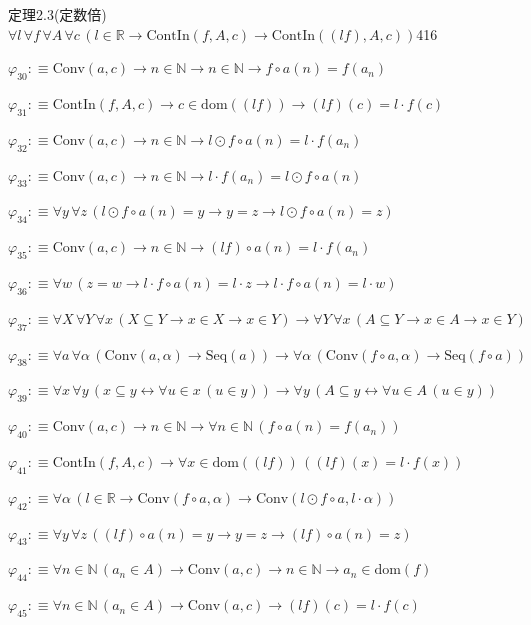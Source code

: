 \begin{fullproof}{定理2.3(定数倍)}{$\forall l\,\forall f\,\forall A\,\forall c\,(l \in \mathbb{R} \to \mathrm{ContIn}(f,A,c) \to \mathrm{ContIn}((l f),A,c))$}{416}
\begin{abbrevlist}
\item $\varphi_{30} :\equiv \mathrm{Conv}(a,c) \to n \in \mathbb{N} \to n \in \mathbb{N} \to f \circ a(n) = f(a_{n})$
\item $\varphi_{31} :\equiv \mathrm{ContIn}(f,A,c) \to c \in \mathrm{dom}((l f)) \to (l f)(c) = l \cdot f(c)$
\item $\varphi_{32} :\equiv \mathrm{Conv}(a,c) \to n \in \mathbb{N} \to l \odot f \circ a(n) = l \cdot f(a_{n})$
\item $\varphi_{33} :\equiv \mathrm{Conv}(a,c) \to n \in \mathbb{N} \to l \cdot f(a_{n}) = l \odot f \circ a(n)$
\item $\varphi_{34} :\equiv \forall y\,\forall z\,(l \odot f \circ a(n) = y \to y = z \to l \odot f \circ a(n) = z)$
\item $\varphi_{35} :\equiv \mathrm{Conv}(a,c) \to n \in \mathbb{N} \to (l f) \circ a(n) = l \cdot f(a_{n})$
\item $\varphi_{36} :\equiv \forall w\,(z = w \to l \cdot f \circ a(n) = l \cdot z \to l \cdot f \circ a(n) = l \cdot w)$
\item $\varphi_{37} :\equiv \forall X\,\forall Y\,\forall x\,(X \subseteq Y \to x \in X \to x \in Y) \to \forall Y\,\forall x\,(A \subseteq Y \to x \in A \to x \in Y)$
\item $\varphi_{38} :\equiv \forall a\,\forall \alpha\,(\mathrm{Conv}(a,\alpha) \to \mathrm{Seq}(a)) \to \forall \alpha\,(\mathrm{Conv}(f \circ a,\alpha) \to \mathrm{Seq}(f \circ a))$
\item $\varphi_{39} :\equiv \forall x\,\forall y\,(x \subseteq y \leftrightarrow \forall u \in x\,(u \in y)) \to \forall y\,(A \subseteq y \leftrightarrow \forall u \in A\,(u \in y))$
\item $\varphi_{40} :\equiv \mathrm{Conv}(a,c) \to n \in \mathbb{N} \to \forall n \in \mathbb{N}\,(f \circ a(n) = f(a_{n}))$
\item $\varphi_{41} :\equiv \mathrm{ContIn}(f,A,c) \to \forall x \in \mathrm{dom}((l f))\,((l f)(x) = l \cdot f(x))$
\item $\varphi_{42} :\equiv \forall \alpha\,(l \in \mathbb{R} \to \mathrm{Conv}(f \circ a,\alpha) \to \mathrm{Conv}(l \odot f \circ a,l \cdot \alpha))$
\item $\varphi_{43} :\equiv \forall y\,\forall z\,((l f) \circ a(n) = y \to y = z \to (l f) \circ a(n) = z)$
\item $\varphi_{44} :\equiv \forall n \in \mathbb{N}\,(a_{n} \in A) \to \mathrm{Conv}(a,c) \to n \in \mathbb{N} \to a_{n} \in \mathrm{dom}(f)$
\item $\varphi_{45} :\equiv \forall n \in \mathbb{N}\,(a_{n} \in A) \to \mathrm{Conv}(a,c) \to (l f)(c) = l \cdot f(c)$

\end{abbrevlist}
\end{fullproof}
